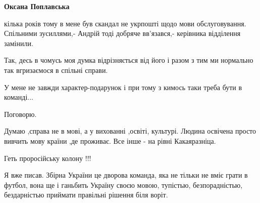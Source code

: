 \begin{itemize}
\begin{itemize}
\begin{itemize}
\textbf{Оксана Поплавська} 

кілька років тому в мене був скандал не укрпошті щодо мови обслуговування.
Спільними зусиллями,- Андрій тоді добряче вв'язався,- керівника відділення
замінили.

Так, десь в чомусь моя думка відрізняється від його і разом з тим ми нормально
так вгризаємося в спільні справи.

У мене не завжди характер-подарунок і при тому з кимось таки треба бути в
команді...

Поговорю.
\end{itemize}

\end{itemize}

 
Думаю ,справа не в мові, а у вихованні ,освіті, культурі. Людина освічена просто
вивчить мову країни ,де проживає. Все інше - на рівні Какаяразніца.


 
Геть проросійську колону !!!


 

Я вже писав. Збірна України це дворова команда, яка не тільки не вміє грати в
футбол, вона ще і ганьбить Україну своєю мовою,
тупістью, безпорадністью, бездарністью приймати правільні рішення біля воріт.

 


\end{itemize}
